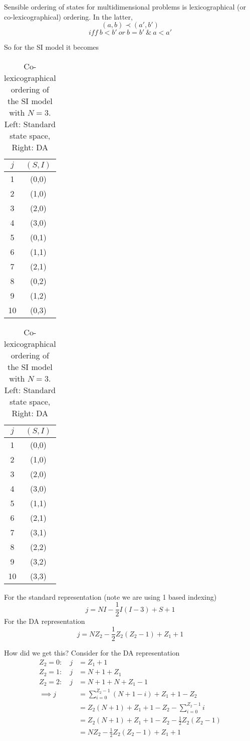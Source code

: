 \documentclass{/home/janmebows/Documents/LatexTemplates/myassignment}
\begin{document}
\clearpage
Sensible ordering of states for multidimensional problems is lexicographical (or co-lexicographical) ordering. In the latter,
\[(a,b) \prec (a',b')\]
\[iff \ b < b' \ or \  b = b' \ \& \ a < a'\]


So for the SI model it becomes
\begin{table}[h]
    \centering
    \begin{tabular}{c|c}
         $j$&$(S,I)$ \\\hline
         1&(0,0)\\
         2&(1,0)\\
         3&(2,0)\\
         4&(3,0)\\
         5&(0,1)\\
         6&(1,1)\\
         7&(2,1)\\
         8&(0,2)\\
         9&(1,2)\\
         10&(0,3)\\
    \end{tabular}
        \begin{tabular}{c|c}
         $j$&$(S,I)$ \\\hline
         1&(0,0)\\
         2&(1,0)\\
         3&(2,0)\\
         4&(3,0)\\
         5&(1,1)\\
         6&(2,1)\\
         7&(3,1)\\
         8&(2,2)\\
         9&(3,2)\\
         10&(3,3)\\
    \end{tabular}
    \caption{Co-lexicographical ordering of the SI model with $N=3$. Left: Standard state space, Right: DA}
\end{table}


For the standard representation (note we are using 1 based indexing)
\[j = N I - \frac12 I ( I -3) + S + 1\]
For the DA representation
\[j = NZ_2 - \frac12 Z_2 (Z_2 -1) + Z_1 + 1\]

How did we get this?
Consider for the DA representation
\begin{align*}
    Z_2 = 0 : \quad j &= Z_1 + 1\\
    Z_2 = 1 : \quad j &= N+1 + Z_1\\
    Z_2 = 2 : \quad j &= N+1 + N + Z_1 - 1\\
    \implies j&= \sum_{i=0}^{Z_2-1} (N+1-i) + Z_1 + 1 - Z_2\\
    &= Z_2 (N+1) + Z_1 + 1 - Z_2 - \sum_{i=0}^{Z_2-1} i\\
    &= Z_2 (N+1) + Z_1 + 1 - Z_2 - \frac12 Z_2 (Z_2-1)\\
    &= NZ_2 - \frac12 Z_2 (Z_2 - 1) + Z_1 + 1
\end{align*}
\end{document}
